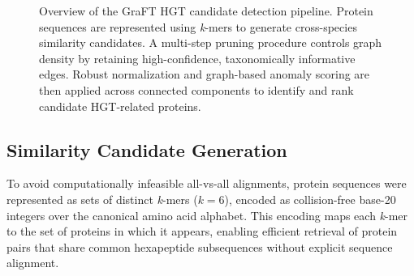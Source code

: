 \documentclass[11pt]{article}
\begin{document}
\begin{figure}[p]
\centering
{}
\caption{Overview of the GraFT HGT candidate detection pipeline. Protein sequences are represented using \textit{k}-mers to generate cross-species similarity candidates. A multi-step pruning procedure controls graph density by retaining high-confidence, taxonomically informative edges. Robust normalization and graph-based anomaly scoring are then applied across connected components to identify and rank candidate HGT-related proteins.}
\label{fig:pipeline_overview}
\end{figure}

\subsection{Similarity Candidate Generation}

To avoid computationally infeasible all-vs-all alignments, protein sequences were represented as sets of distinct \textit{k}-mers ($k=6$), encoded as collision-free base-20 integers over the canonical amino acid alphabet\cite{Sims2009,Haubold2014}. This encoding maps each \textit{k}-mer to the set of proteins in which it appears, enabling efficient retrieval of protein pairs that share common hexapeptide subsequences without explicit sequence alignment.
\end{document}
